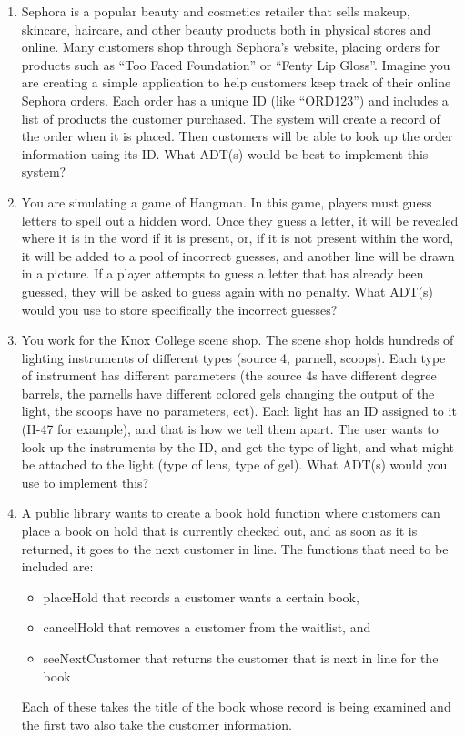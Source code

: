 \documentclass{article}
\begin{document}
\begin{enumerate}
\item 
  Sephora is a popular beauty and cosmetics retailer that sells
  makeup, skincare, haircare, and other beauty products both in
  physical stores and online. Many customers shop through Sephora’s
  website, placing orders for products such as ``Too Faced
  Foundation'' or ``Fenty Lip Gloss''. Imagine you are creating a
  simple application to help customers keep track of their online
  Sephora orders. Each order has a unique ID (like ``ORD123'') and
  includes a list of products the customer purchased. The system will
  create a record of the order when it is placed.
  Then customers will be able to look up the order information using its ID.
What ADT(s) would be best to implement this system?

\item 
  You are simulating a game of Hangman. In this game, players must
  guess letters to spell out a hidden word. Once they guess a letter,
  it will be revealed where it is in the word if it is present, or, if
  it is not present within the word, it will be added to a pool of
  incorrect guesses, and another line will be drawn in a picture. If a
  player attempts to guess a letter that has already been guessed,
  they will be asked to guess again with no penalty. What ADT(s) would
  you use to store specifically the incorrect guesses?

\item 
  You work for the Knox College scene shop. The scene shop holds
  hundreds of lighting instruments of different types (source 4,
  parnell, scoops). Each type of instrument has different
  parameters (the source 4s have different degree barrels, the parnells
  have different colored gels changing the output of the light, the
  scoops have no parameters, ect). Each light has an ID
  assigned to it (H-47 for example), and that is how we tell them
  apart. The user wants to look up the instruments by the ID, and get
  the type of light, and what might be attached to the light (type of
  lens, type of gel). 
  What ADT(s) would you use to implement this?
  
\item 
  A public library wants to create a book hold function where customers can place a book on hold that is currently checked out, and as soon as it is returned, it goes to the next customer in line. The functions that need to be included are:
  \begin{itemize}
    \item  placeHold that records a customer wants a certain book,
    \item cancelHold that removes a customer from the waitlist, and 
    \item seeNextCustomer that returns the customer that is next in line for the book
  \end{itemize}
  Each of these takes the title of the book whose record is being examined and the
  first two also take the customer information.


\end{enumerate}
\end{document}
